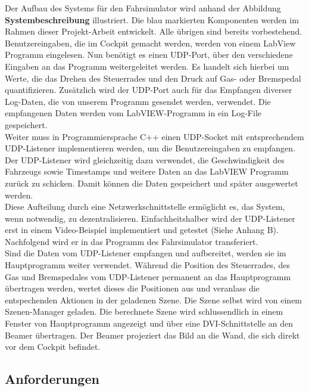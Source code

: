 Der Aufbau des Systems für den Fahrsimulator wird anhand der Abbildung \textbf{Systembeschreibung} illustriert. Die blau markierten Komponenten werden im Rahmen dieser Projekt-Arbeit entwickelt. Alle übrigen sind bereits vorbestehend. \\
Benutzereingaben, die im Cockpit gemacht werden, werden von einem LabView Programm eingelesen. Nun benötigt es einen UDP-Port,  über den verschiedene Eingaben an das Programm weitergeleitet werden. Es handelt sich hierbei um Werte, die das Drehen des Steuerrades und den Druck auf Gas- oder Bremspedal quantifizieren. Zusätzlich wird der UDP-Port auch für das Empfangen diverser Log-Daten, die von unserem Programm gesendet werden, verwendet. Die empfangenen Daten werden vom LabVIEW-Programm  in ein Log-File gespeichert.\\
Weiter  muss in Programmiersprache C++ einen UDP-Socket mit entsprechendem UDP-Listener implementieren werden, um die Benutzereingaben zu empfangen. Der UDP-Listener wird gleichzeitig dazu verwendet, die Geschwindigkeit des Fahrzeugs sowie Timestamps und weitere Daten an das LabVIEW Programm zurück zu schicken. Damit können die Daten gespeichert und später ausgewertet werden.\\
Diese Aufteilung durch eine Netzwerkschnittstelle ermöglicht es,  das System, wenn notwendig, zu dezentralisieren. Einfachheitshalber wird der UDP-Listener erst in einem Video-Beispiel implementiert und getestet (Siehe Anhang B). Nachfolgend wird er in das Programm des Fahrsimulator transferiert.\\
Sind die Daten vom UDP-Listener empfangen und aufbereitet, werden sie im Hauptprogramm weiter verwendet. Während die Position des Steuerrades, des Gas und Bremspedales vom UDP-Listener permanent an das Hauptprogramm übertragen werden, wertet dieses die Positionen aus und veranlass die entspechenden Aktionen in der geladenen Szene. 
Die Szene selbst wird von einem Szenen-Manager geladen. Die berechnete Szene wird schlussendlich in einem Fenster von Hauptprogramm angezeigt und über eine DVI-Schnittstelle an den Beamer übertragen. Der Beamer projeziert das Bild an die Wand, die sich direkt vor dem Cockpit befindet. 

\subsection{Anforderungen}
